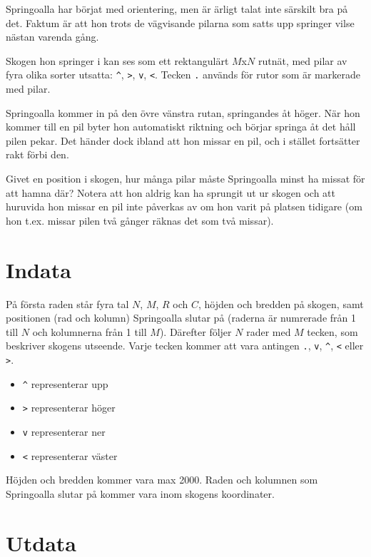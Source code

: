 
Springoalla har börjat med orientering, men är ärligt talat inte
särskilt bra på det. Faktum är att hon trots de vägvisande pilarna
som satts upp springer vilse nästan varenda gång.

Skogen hon springer i kan ses som ett rektangulärt $M$x$N$ rutnät, med
pilar av fyra olika sorter utsatta: \texttt{\^}, \texttt{>}, \texttt{v},
\texttt{<}. Tecken \texttt{.} används för rutor som är markerade med pilar.

Springoalla kommer in på den övre vänstra rutan, springandes åt
höger. När hon kommer till en pil byter hon automatiskt riktning och
börjar springa åt det håll pilen pekar. Det händer dock ibland att
hon missar en pil, och i stället fortsätter rakt förbi den.

Givet en position i skogen, hur många pilar måste Springoalla minst ha
missat för att hamna där? Notera att hon aldrig kan ha sprungit ut ur
skogen och att huruvida hon missar en pil inte påverkas av om hon varit
på platsen tidigare (om hon t.ex. missar pilen två gånger räknas det
som två missar).

\section*{Indata}

På första raden står fyra tal $N$, $M$, $R$ och $C$, höjden och bredden på
skogen, samt positionen (rad och kolumn) Springoalla slutar på (raderna
är numrerade från 1 till $N$ och kolumnerna från 1 till $M$). Därefter
följer $N$ rader med $M$ tecken, som beskriver skogens utseende. Varje
tecken kommer att vara antingen \texttt{.}, \texttt{v}, \texttt{\^}, \texttt{<} eller \texttt{>}.

\begin{itemize}
\item \texttt{\^} representerar upp
\item \texttt{>} representerar höger
\item \texttt{v} representerar ner
\item \texttt{<} representerar väster
\end{itemize}

Höjden och bredden kommer vara max 2000. Raden och kolumnen som
Springoalla slutar på kommer vara inom skogens koordinater.

\section*{Utdata}

